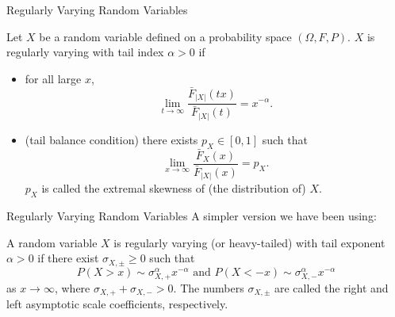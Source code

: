 \documentclass{beamer}
\begin{document}
\begin{frame}{Regularly Varying Random Variables}
    \begin{definition}
        Let $X$ be a random variable defined on a probability space $(\Omega, F, P)$. $X$ is regularly varying with tail index $\alpha > 0$ if
        \begin{itemize}
            \item for all large $x$,
            \[
            \lim_{t \to \infty} \frac{\bar{F}_{|X|}(t x)}{\bar{F}_{|X|}(t)} = x^{-\alpha}.
            \]
            \item (tail balance condition) there exists $p_X \in [0, 1]$ such that
            \[
            \lim_{x \to \infty} \frac{\bar{F}_X(x)}{\bar{F}_{|X|}(x)} = p_X.
            \]
            $p_X$ is called the extremal skewness of (the distribution of) $X$.
        \end{itemize}
    \end{definition}
\end{frame}

\begin{frame}{Regularly Varying Random Variables}
    A simpler version we have been using:
    \begin{definition}
        A random variable $X$ is regularly varying (or heavy-tailed) with tail exponent $\alpha > 0$ if there exist $\sigma_{X, \pm} \ge 0$ such that
        \begin{equation*}\label{eq:tail_conds}
            P(X > x) \sim \sigma_{X, +}^{\alpha}x^{-\alpha} \text{ and } P(X < -x) \sim \sigma_{X, -}^{\alpha}x^{-\alpha}
        \end{equation*}
        as $x \to \infty$, where $\sigma_{X, +} + \sigma_{X, -} > 0$. The numbers $\sigma_{X, \pm}$ are called the right and left asymptotic scale coefficients, respectively.
    \end{definition}
\end{frame}

    
        
\end{document}
